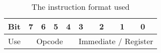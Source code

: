 \begin{table}[b]
\caption{The instruction format used}
\label{tab:instruction}
\centering
\begin{tabular}{|p{1cm}|p{1cm}|p{1cm}|p{1cm}|p{1cm}|p{1cm}|p{1cm}|p{1cm}|p{1cm}|} \hline
Bit & 7 & 6 & 5 & 4 & 3 & 2 & 1 & 0 \\ \hline
Use & \multicolumn{4}{|c|}{Opcode} & \multicolumn{4}{|c|}{Immediate / Register} \\ \hline
\end{tabular}
\end{table}
